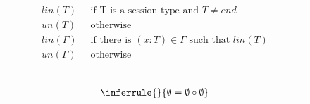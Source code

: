 \begin{figure}[h]
    \centering
    \begin{equation*}
        \begin{split}
            lin(T) \;&\; \text{if T is a session type and } T \not = end \\
            un(T) \;&\; \text{otherwise} \\
            lin(\Gamma) \;&\; \text{if there is } (x:T)\in \Gamma \text{ such that } lin(T) \\
            un(\Gamma) \;&\; \text{otherwise} \\
        \end{split}
    \end{equation*}
    \noindent\rule{12cm}{0.8pt}

    \begin{align*}
        \begin{split}
            \inferrule{ }{\emptyset = \emptyset \circ \emptyset} \\

\end{split}
\end{align*}
\end{figure}

